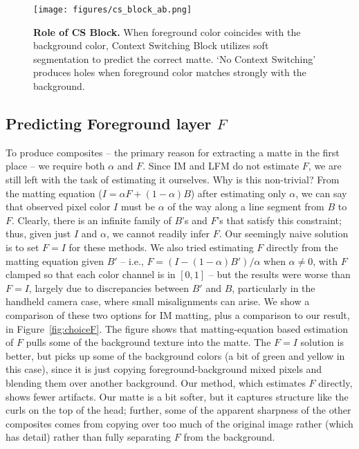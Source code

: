 \documentclass[10pt,twocolumn,letterpaper]{article}
\begin{document}
\begin{figure*}[!ht]
	\centering
	\texttt{[image: figures/cs\_block\_ab.png]}
	\caption{\small \textbf{Role of CS Block.} When foreground color coincides with the background color, Context Switching Block utilizes soft segmentation to predict the correct matte. `No Context Switching' produces holes when foreground color matches strongly with the background.}
\label{fig:cs_block_ab}	
\end{figure*}



\subsection{Predicting Foreground layer $F$}
\label{sec:fg}
To produce composites -- the primary reason for extracting a matte in the first place -- we require both $\alpha$ and $F$.  Since IM and LFM do not estimate $F$, we are still left with the task of estimating it ourselves.  Why is this non-trivial?  From the matting equation ($I = \alpha F + (1-\alpha) B$) after estimating only $\alpha$, we can say that observed pixel color $I$ must be $\alpha$ of the way along a line segment from $B$ to $F$.  Clearly, there is an infinite family of $B$'s and $F$'s that satisfy this constraint; thus, given just $I$ and $\alpha$, we cannot readily infer $F$.  Our seemingly naive solution is to set $F = I$ for these methods.  We also tried estimating $F$ directly from the matting equation given $B'$ -- i.e., $F = (I-(1-\alpha)B')/\alpha$ when $\alpha \neq 0$, with $F$ clamped so that each color channel is in $[0,1]$ -- but the results were worse than $F=I$, largely due to discrepancies between $B'$ and $B$, particularly in the handheld camera case, where small misalignments can arise. We show a comparison of these two options for IM matting, plus a comparison to our result, in Figure~\ref{fig:choiceF}.  The figure shows that matting-equation based estimation of $F$ pulls some of the background texture into the matte.  The $F=I$ solution is better, but picks up some of the background colors (a bit of green and yellow in this case), since it is just copying foreground-background mixed pixels and blending them over another background.  Our method, which estimates $F$ directly, shows fewer artifacts.  Our matte is a bit softer, but it captures structure like the curls on the top of the head; further, some of the apparent sharpness of the other composites comes from copying over too much of the original image rather (which has detail) rather than fully separating $F$ from the background.
\end{document}
